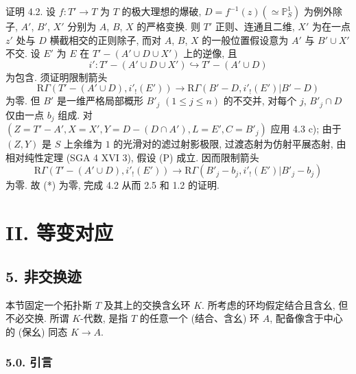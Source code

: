 证明 4.2. 设 $f:T'\to T$ 为 $T$ 的极大理想的爆破, $D=f^{-1}(z)(\simeq\mathbb P^1_S)$ 为例外除子, $A'$, $B'$, $X'$ 分别为 $A$, $B$, $X$ 的严格变换. 则 $T'$ 正则、连通且二维, $X'$ 为在一点 $z'$ 处与 $D$ 横截相交的正则除子, 而对 $A$, $B$, $X$ 的一般位置假设意为 $A'$ 与 $B'\cup X'$ 不交. 设 $E'$ 为 $E$ 在 $T'-(A'\cup D\cup X')$ 上的逆像, 且
\[
i':T'-(A'\cup D\cup X')\hookrightarrow T'-(A'\cup D)
\]
为包含. 须证明限制箭头
\begin{equation}
\mathrm R\Gamma(T'-(A'\cup D),i'_!(E'))
\longrightarrow
\mathrm R\Gamma(B'-D,i'_!(E')|B'-D)
\tag{*}
\end{equation}
为零. 但 $B'$ 是一维严格局部概形 $B'_j$ $(1\le j\le n)$ 的不交并, 对每个 $j$, $B'_j\cap D$ 仅由一点 $b_j$ 组成. 对 $(Z=T'-A', X=X', Y=D-(D\cap A'), L=E', C=B'_j)$ 应用 4.3 c); 由于 $(Z,Y)$ 是 $S$ 上余维为 $1$ 的光滑对的滤过射影极限, 过渡态射为仿射平展态射, 由相对纯性定理 (SGA 4 XVI 3), 假设 (P) 成立. 因而限制箭头
\[
\mathrm R\Gamma(T'-(A'\cup D),i'_!(E'))
\longrightarrow
\mathrm R\Gamma(B'_j-b_j,i'_!(E')|B'_j-b_j)
\]
为零. 故 (*) 为零, 完成 4.2 从而 2.5 和 1.2 的证明.

\section*{II. 等变对应}

\subsection*{5. 非交换迹}

本节固定一个拓扑斯 $T$ 及其上的交换含幺环 $K$. 所考虑的环均假定结合且含幺, 但不必交换. 所谓 $K$-代数, 是指 $T$ 的任意一个 (结合、含幺) 环 $A$, 配备像含于中心的 (保幺) 同态 $K\to A$.

\subsubsection*{5.0. 引言}

